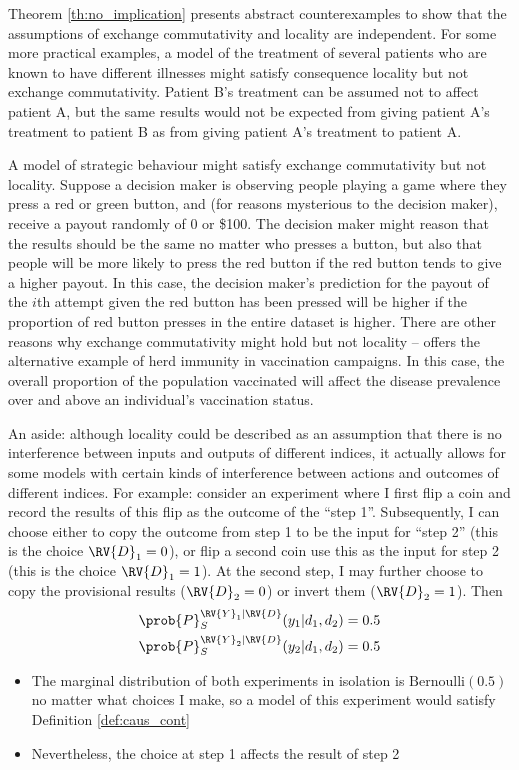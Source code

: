 Theorem \ref{th:no_implication} presents abstract counterexamples to show that the assumptions of exchange commutativity and locality are independent. For some more practical examples, a model of the treatment of several patients who are known to have different illnesses might satisfy consequence locality but not exchange commutativity. Patient B's treatment can be assumed not to affect patient A, but the same results would not be expected from giving patient A's treatment to patient B as from giving patient A's treatment to patient A.

A model of strategic behaviour might satisfy exchange commutativity but not locality. Suppose a decision maker is observing people playing a game where they press a red or green button, and (for reasons mysterious to the decision maker), receive a payout randomly of 0 or \$100. The decision maker might reason that the results should be the same no matter who presses a button, but also that people will be more likely to press the red button if the red button tends to give a higher payout. In this case, the decision maker's prediction for the payout of the $i$th attempt given the red button has been pressed will be higher if the proportion of red button presses in the entire dataset is higher. There are other reasons why exchange commutativity might hold but not locality -- \citet{dawid_causal_2000} offers the alternative example of herd immunity in vaccination campaigns. In this case, the overall proportion of the population vaccinated will affect the disease prevalence over and above an individual's vaccination status.

An aside: although locality could be described as an assumption that there is no interference between inputs and outputs of different indices, it actually allows for some models with certain kinds of interference between actions and outcomes of different indices. For example: consider an experiment where I first flip a coin and record the results of this flip as the outcome of the ``step 1''. Subsequently, I can choose either to copy the outcome from step 1 to be the input for ``step 2'' (this is the choice $\RV{D}_1=0$), or flip a second coin use this as the input for step 2 (this is the choice $\RV{D}_1=1$). At the second step, I may further choose to copy the provisional results ($\RV{D}_2=0$) or invert them ($\RV{D}_2=1$). Then
\begin{align}
    \prob{P}_S^{\RV{Y}_1|\RV{D}}(y_1|d_1,d_2) &= 0.5\\
    \prob{P}_S^{\RV{Y}_2|\RV{D}}(y_2|d_1,d_2) &= 0.5
\end{align}
\begin{itemize}
    \item The marginal distribution of both experiments in isolation is $\text{Bernoulli}(0.5)$ no matter what choices I make, so a model of this experiment would satisfy Definition \ref{def:caus_cont}
    \item Nevertheless, the choice at step 1 affects the result of step 2
\end{itemize}

